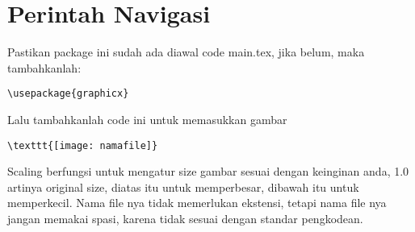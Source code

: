 \section{Perintah Navigasi}
Pastikan package ini sudah ada diawal code main.tex, jika belum, maka tambahkanlah:
\begin{lstlisting}
\usepackage{graphicx}
\end{lstlisting}

Lalu tambahkanlah code ini untuk memasukkan gambar
\begin{lstlisting}
\texttt{[image: namafile]}
\end{lstlisting}

Scaling berfungsi untuk mengatur size gambar sesuai dengan keinginan anda, 1.0 artinya original size, diatas itu untuk memperbesar, dibawah itu untuk memperkecil. Nama file nya tidak memerlukan ekstensi, tetapi nama file nya jangan memakai spasi, karena tidak sesuai dengan standar pengkodean. 